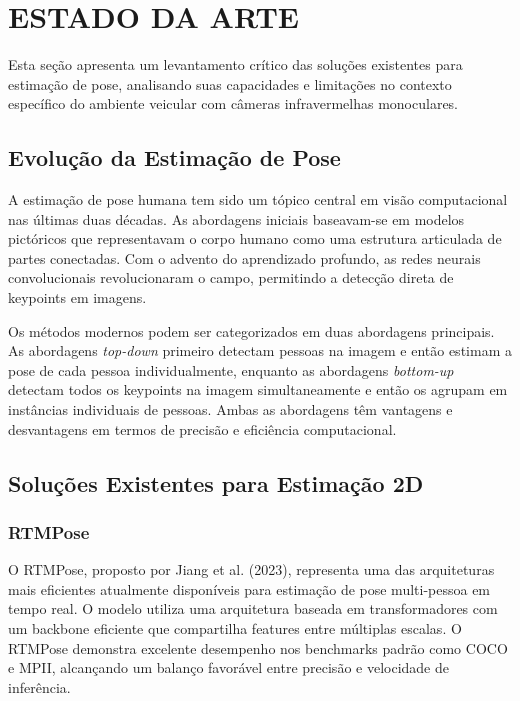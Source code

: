 \documentclass[12pt, a4paper]{article}
\begin{document}
\section{ESTADO DA ARTE}
\label{sec:estado_arte}

Esta seção apresenta um levantamento crítico das soluções existentes para estimação de pose, analisando suas capacidades e limitações no contexto específico do ambiente veicular com câmeras infravermelhas monoculares.

\subsection{Evolução da Estimação de Pose}

A estimação de pose humana tem sido um tópico central em visão computacional nas últimas duas décadas. As abordagens iniciais baseavam-se em modelos pictóricos que representavam o corpo humano como uma estrutura articulada de partes conectadas. Com o advento do aprendizado profundo, as redes neurais convolucionais revolucionaram o campo, permitindo a detecção direta de keypoints em imagens.

Os métodos modernos podem ser categorizados em duas abordagens principais. As abordagens \textit{top-down} primeiro detectam pessoas na imagem e então estimam a pose de cada pessoa individualmente, enquanto as abordagens \textit{bottom-up} detectam todos os keypoints na imagem simultaneamente e então os agrupam em instâncias individuais de pessoas. Ambas as abordagens têm vantagens e desvantagens em termos de precisão e eficiência computacional.

\subsection{Soluções Existentes para Estimação 2D}

\subsubsection{RTMPose}

O RTMPose, proposto por Jiang et al. (2023), representa uma das arquiteturas mais eficientes atualmente disponíveis para estimação de pose multi-pessoa em tempo real. O modelo utiliza uma arquitetura baseada em transformadores com um backbone eficiente que compartilha features entre múltiplas escalas. O RTMPose demonstra excelente desempenho nos benchmarks padrão como COCO e MPII, alcançando um balanço favorável entre precisão e velocidade de inferência.
\end{document}
